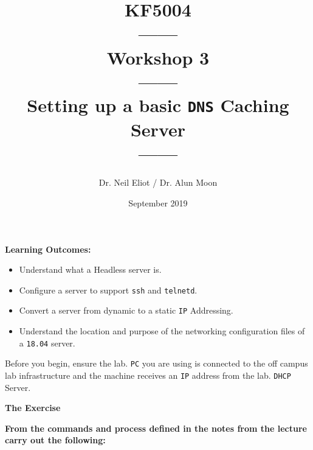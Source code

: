 \documentclass[11pt]{article}
\begin{document}
\author{Dr. Neil Eliot / Dr. Alun Moon}
\title{KF5004\\------\\Workshop 3\\------\\Setting up a basic \texttt{DNS} Caching Server\\------}
\date{September 2019}
\maketitle

\newpage



\noindent\textbf{Learning Outcomes:}
\begin{itemize}
    \item Understand what a Headless server is.
    \item Configure a server to support \texttt{ssh} and \texttt{telnetd}.
    \item Convert a server from dynamic to a static \texttt{IP} Addressing.
    \item Understand the location and purpose of the networking configuration files of a \texttt{18.04} server.
\end{itemize}


\begin{tcolorbox}[title={\textbf{Important:}}]
    Before you begin, ensure the lab. \texttt{PC} you are using is connected to the off campus lab infrastructure and the machine receives an \texttt{IP} address from the lab. \texttt{DHCP} Server.
\end{tcolorbox}
\newpage

\noindent\textbf{The Exercise}\\
\begin{tcolorbox}[colback=blue!20]
    \noindent\textbf{From the commands and process defined in the notes from the lecture carry out the following:}
\end{tcolorbox}
\end{document}
